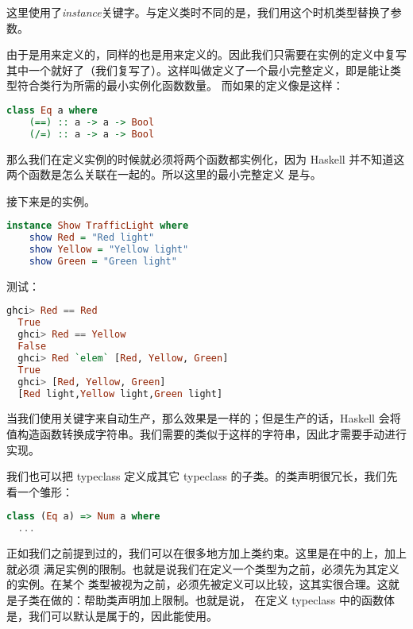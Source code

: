 \documentclass[./main.tex]{subfiles}
\begin{document}
这里使用了\textit{instance}关键字。与定义类时不同的是，我们用这个时机类型替换了参数。

由于\acode{==}是用\acode{/=}来定义的，同样的\acode{/=}也是用\acode{==}来定义的。因此我们只需要在实例的定义中复写
其中一个就好了（我们复写了\acode{==}）。这样叫做定义了一个最小完整定义，即是能让类型符合类行为所需的最小实例化函数数量。
而如果的定义像是这样：

\begin{lstlisting}[language=Haskell]
  class Eq a where
    (==) :: a -> a -> Bool
    (/=) :: a -> a -> Bool
\end{lstlisting}

那么我们在定义实例的时候就必须将两个函数都实例化，因为 Haskell 并不知道这两个函数是怎么关联在一起的。所以这里的最小完整定义
是\acode{==}与\acode{/=}。

接下来是的实例。

\begin{lstlisting}[language=Haskell]
  instance Show TrafficLight where
    show Red = "Red light"
    show Yellow = "Yellow light"
    show Green = "Green light"
\end{lstlisting}

测试：

\begin{lstlisting}[language=Haskell]
  ghci> Red == Red
  True
  ghci> Red == Yellow
  False
  ghci> Red `elem` [Red, Yellow, Green]
  True
  ghci> [Red, Yellow, Green]
  [Red light,Yellow light,Green light]
\end{lstlisting}

当我们使用关键字来自动生产，那么效果是一样的；但是生产的话，Haskell 会将
值构造函数转换成字符串。我们需要的类似于这样的字符串，因此才需要手动进行实现。

我们也可以把 typeclass 定义成其它 typeclass 的子类。的类声明很冗长，我们先看一个雏形：

\begin{lstlisting}[language=Haskell]
  class (Eq a) => Num a where
  ...
\end{lstlisting}

正如我们之前提到过的，我们可以在很多地方加上类约束。这里是在中的上，加上就必须
满足实例的限制。也就是说我们在定义一个类型为之前，必须先为其定义的实例。在某个
类型被视为之前，必须先被定义可以比较，这其实很合理。这就是子类在做的：帮助类声明加上限制。也就是说，
在定义 typeclass 中的函数体是，我们可以默认是属于的，因此能使用\acode{==}。
\end{document}
